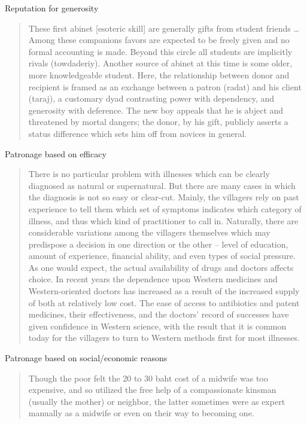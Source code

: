 \documentclass[
]{article}
\begin{document}
Reputation for generosity

\begin{quote}
These first abinet {[}esoteric skill{]} are generally gifts from student friends \ldots{} Among these companions favors are expected to be freely given and no formal accounting is made. Beyond this circle all students are implicitly rivals (towdaderiy). Another source of abinet at this time is some older, more knowledgeable student. Here, the relationship between donor and recipient is framed as an exchange between a patron (radat) and his client (taraj), a customary dyad contrasting power with dependency, and generosity with deference. The new boy appeals that he is abject and threatened by mortal dangers; the donor, by his gift, publicly asserts a status difference which sets him off from novices in general.
\end{quote}

Patronage based on efficacy

\begin{quote}
There is no particular problem with illnesses which can be clearly diagnosed as natural or supernatural. But there are many cases in which the diagnosis is not so easy or clear-cut. Mainly, the villagers rely on past experience to tell them which set of symptoms indicates which category of illness, and thus which kind of practitioner to call in. Naturally, there are considerable variations among the villagers themselves which may predispose a decision in one direction or the other -- level of education, amount of experience, financial ability, and even types of social pressure. As one would expect, the actual availability of drugs and doctors affects choice. In recent years the dependence upon Western medicines and Western-oriented doctors has increased as a result of the increased supply of both at relatively low cost. The ease of access to antibiotics and patent medicines, their effectiveness, and the doctors' record of successes have given confidence in Western science, with the result that it is common today for the villagers to turn to Western methods first for most illnesses.
\end{quote}

Patronage based on social/economic reasons

\begin{quote}
Though the poor felt the 20 to 30 baht cost of a midwife was too expensive, and so utilized the free help of a compassionate kinsman (usually the mother) or neighbor, the latter sometimes were as expert manually as a midwife or even on their way to becoming one.
\end{quote}
\end{document}
